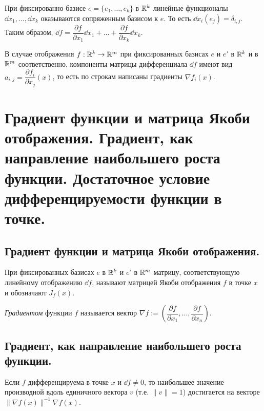 \documentclass[a4paper]{article}
\theoremstyle{named}
\begin{document}
    \begin{remark*}
        При фиксированно базисе $e = \{e_1, \dots, e_k\}$ в $\mathbb{R}^k$ линейные функционалы $\dd x_1, \dots, \dd x_k$ оказываются сопряженным базисом к $e$. То есть $\dd x_i(e_j) = \delta_{i, j}$. Таким образом, $\dd f = \dfrac{\partial f}{\partial x_1}\dd x_1 + \dots + \dfrac{\partial f}{\partial x_k}\dd x_k$.
    \end{remark*}

    \begin{remark*}
        В случае отображения $f: \mathbb{R}^k \to \mathbb{R}^m$ при фиксированных базисах $e$ и $e'$ в $\mathbb{R}^k$ и в $\mathbb{R}^m$ соответственно, компоненты матрицы дифференциала $\dd f$ имеют вид $a_{i, j} = \dfrac{\partial f_i}{\partial x_j}(x)$, то есть по строкам написаны градиенты $\nabla f_i(x)$.
    \end{remark*}

    \section{Градиент функции и матрица Якоби отображения. Градиент, как направление наибольшего роста функции. Достаточное условие дифференцируемости функции в точке.}

    \subsection{Градиент функции и матрица Якоби отображения.}

    \begin{definition*}
        При фиксированных базисах $e$ в $\mathbb{R}^k$ и $e'$ в $\mathbb{R}^m$ матрицу, соответствующую линейному отображению $\dd f$, называют матрицей Якоби отображения $f$ в точке $x$ и обозначают $J_f(x)$.
    \end{definition*}

    \begin{definition*}
        {\it Градиентом} функции $f$ называется вектор
        $\nabla f:=\left(\dfrac{\partial f}{\partial x_1},\ldots,\dfrac{\partial f}{\partial x_n}\right)$.
    \end{definition*}

    \subsection{Градиент, как направление наибольшего роста функции.}

    \begin{lemma*}
        Если $f$ дифференцируема в точке $x$ и $\dd f\ne0$, то наибольшее значение производной вдоль единичного вектора
        $v$ (т.е. $\|v\|=1$) достигается на векторе $\|\nabla f(x)\|^{-1}\nabla f(x)$.
    \end{lemma*}
\end{document}
